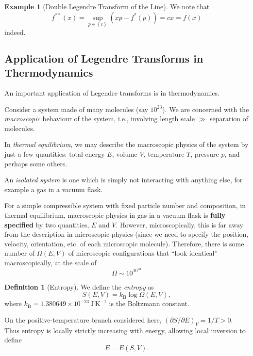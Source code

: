 \documentclass[11pt]{article}
\numberwithin{equation}{section}
\theoremstyle{definition}
\newtheorem{definition}[theorem]{Definition}
\newtheorem{example}[theorem]{Example}
\theoremstyle{remark}
\newcommand{\pqty}[1]{\left(#1\right)}
\newcommand{\Bqty}[1]{\left\{#1\right\}}
\newcommand{\legendre}[1]{{#1}^{*}}
\newcommand{\llegendre}[1]{{#1}^{**}}
\begin{document}
\begin{example}[Double Legendre Transform of the Line]\label{variation-unit-0025}
    We note that
    \[
        \llegendre{f} \pqty{x} = \sup_{p \in \Bqty{c}} \pqty{xp - \legendre{f} \pqty{p}} = cx = f\pqty{x}
    \]
    indeed.
\end{example}

\subsection{Application of Legendre Transforms in Thermodynamics}

An important application of Legendre transforms is in thermodynamics.

Consider a system made of many molecules (say \(10^{23}\)). We are concerned with the \emph{macroscopic} behaviour of the system, i.e., involving length scale \(\gg\) separation of molecules.

In \emph{thermal equilibrium}, we may describe the macroscopic physics of the system by just a few quantities: total energy \(E\), volume \(V\), temperature \(T\), pressure \(p\), and perhaps some others.

An \emph{isolated system} is one which is simply not interacting with anything else, for example a gas in a vacuum flask.

For a simple compressible system with fixed particle number and composition, in thermal equilibrium, macroscopic physics in gas in a vacuum flask is \textbf{fully specified} by two quantities, \(E\) and \(V\). However, microscopically, this is far away from the description in microscopic physics (since we need to specify the position, velocity, orientation, etc. of each microscopic molecule). Therefore, there is some number of \(\Omega \pqty{E, V}\) of microscopic configurations that ``look identical'' macroscopically, at the scale of
\[
    \Omega \sim 10^{10^{23}}
\]

\begin{definition}[Entropy]\label{variation-unit-0026}
    We define the \emph{entropy} as
    \begin{equation}
        \label{eq:entropy}%
        S\pqty{E, V} = k_{\text{B}} \log \Omega \pqty{E, V},
    \end{equation}
    where \(k_{\text{B}} = 1.380649\times10^{-23}\,\mathrm{J\,K^{-1}}\) is the Boltzmann constant.
\end{definition}

On the positive-temperature branch considered here, \((\partial S/\partial E)_V=1/T>0\). Thus entropy is locally strictly increasing with energy, allowing local inversion to define
\begin{equation}
    \label{eq:energy}%
    E = E \pqty{S, V}.
\end{equation}
\end{document}
